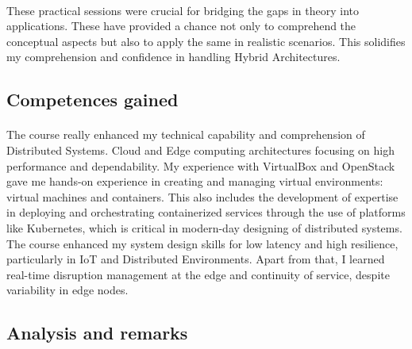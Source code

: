 \paragraph{}These practical sessions were crucial for bridging the gaps in theory into applications. These have provided a chance not only to comprehend the conceptual aspects but also to apply the same in realistic scenarios. This solidifies my comprehension and confidence in handling Hybrid Architectures.

\subsection{Competences gained}
\paragraph{}The course really enhanced my technical capability and comprehension of Distributed Systems. Cloud and Edge computing architectures focusing on high performance and dependability. My experience with VirtualBox and OpenStack gave me hands-on experience in creating and managing virtual environments: virtual machines and containers. This also includes the development of expertise in deploying and orchestrating containerized services through the use of platforms like Kubernetes, which is critical in modern-day designing of distributed systems. The course enhanced my system design skills for low latency and high resilience, particularly in IoT and Distributed Environments. Apart from that, I learned real-time disruption management at the edge and continuity of service, despite variability in edge nodes.

\subsection{Analysis and remarks}
